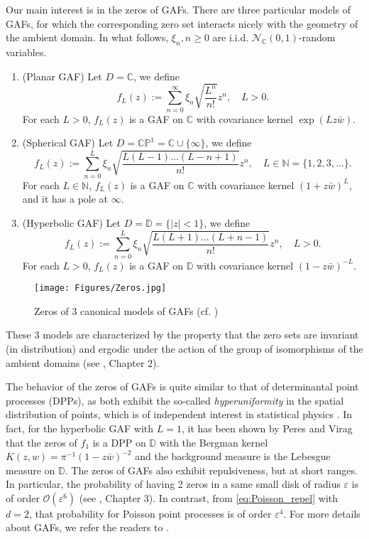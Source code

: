 Our main interest is in the zeros of GAFs. There are three particular models of GAFs, for which the corresponding zero set interacts nicely with the geometry of the ambient domain. In what follows, $\xi_n, n\ge 0$ are i.i.d. $\mathcal N_{\mathbb C}(0,1)$-random variables.

\begin{enumerate}
    \item(Planar GAF) Let $D= \mathbb C$, we define
    \[ f_L(z) := \sum_{n=0}^\infty \xi_n \sqrt{\frac{L^n}{n!}}z^n, \quad L>0.\]
    For each $L>0$, $f_L(z)$ is a GAF on $\mathbb C$ with covariance kernel $\exp(Lz\bar w)$.
    \item(Spherical GAF)
    Let $D= \mathbb C \mathbb P^1 = \mathbb C \cup \{\infty\}$, we define 
    \[f_L(z) := \sum_{n=0}^L \xi_n \sqrt{\frac{L(L-1)\ldots(L-n+1)}{n!}}z^n, \quad L \in \mathbb N=\{1,2,3,\ldots\}.\]
    For each $L\in \mathbb N$, $f_L(z)$ is a GAF on $\mathbb C$ with covariance kernel $(1+z\bar w)^L$, and it has a pole at $\infty$.
    \item(Hyperbolic GAF) Let $D= \mathbb D = \{|z|<1\}$, we define 
    \[f_L(z) := \sum_{n=0}^L \xi_n \sqrt{\frac{L(L+1)\ldots(L+n-1)}{n!}}z^n, \quad L >0.\]
    For each $L>0$, $f_L(z)$ is a GAF on $\mathbb D$ with covariance kernel $(1-z\bar w)^{-L}$. 
\end{enumerate}

\begin{figure}[h]
    \centering
    \texttt{[image: Figures/Zeros.jpg]}
    \caption{Zeros of 3 canonical models of GAFs (cf. \cite{BARDENET_GAF})}
    \label{fig:zeros}
\end{figure}

These 3 models are characterized by the property that the zero sets are invariant (in distribution) and ergodic under the action of the group of isomorphisms of the ambient domains (see \cite{hough2009zeros}, Chapter 2). 

The behavior of the zeros of GAFs is quite similar to that of determinantal point processes (DPPs), as both exhibit the so-called \emph{hyperuniformity} in the spatial distribution of points, which is of independent interest in statistical physics \cite{Ghosh2016NumberRI, GhoshLebowitz, PhysRevE}. 
In fact, for the hyperbolic GAF with $L=1$, it has been shown by Peres and Virag \cite{PeresVirag} that the zeros of $f_1$ is a DPP on $\mathbb D$ with the Bergman kernel $K(z,w) = \pi^{-1} (1-z\bar w)^{-2}$ and the background measure is the Lebesgue measure on $\mathbb D$. The zeros of GAFs also exhibit repulsiveness, but at short ranges. In particular, the probability of having 2 zeros in a same small disk of radius $\varepsilon$ is of order $\mathcal{O}(\varepsilon^6)$ (see \cite{hough2009zeros}, Chapter 3). In contrast, from \eqref{eq:Poisson_repel} with $d=2$, that probability for Poisson point processes is of order $\varepsilon^4$.
For more details about GAFs, we refer the readers to \cite{hough2009zeros, sodin}.

